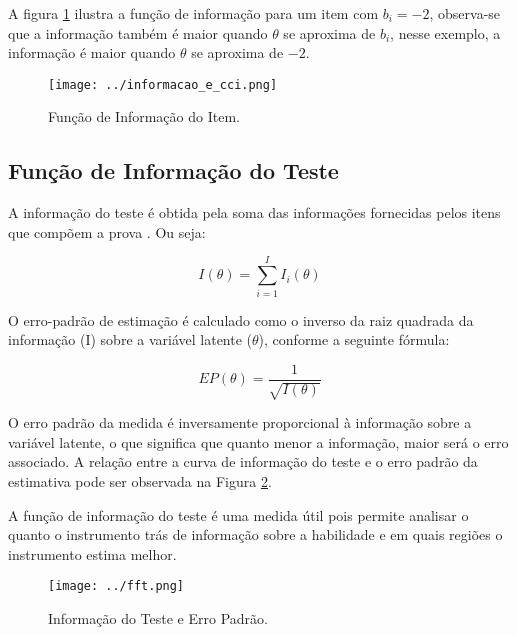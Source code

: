 A figura \ref{fig:fii} ilustra a função de informação para um item com $b_i = -2$, observa-se que a informação também é maior quando $\theta$ se aproxima de $b_i$, nesse exemplo, a informação é maior quando $\theta$ se aproxima de $-2$.

\begin{figure}[H]
	\centering
	\caption{Função de Informação do Item.}
	\texttt{[image: ../informacao\_e\_cci.png]}
		\parbox{\textwidth}{
		\centering %
	}
	\label{fig:fii}
\end{figure}

\subsection{Função de Informação do Teste}

A informação do teste é obtida pela soma das informações fornecidas pelos itens que compõem a prova \cite{de2000teoria}. Ou seja:

\begin{equation}\label{eq:info_teste}
I(\theta) = \sum_{i=1}^{I}I_i(\theta)
\end{equation}

 O erro-padrão de estimação é calculado como o inverso da raiz quadrada da informação (I) sobre a variável latente ($\theta$), conforme a seguinte fórmula:

\[
EP(\theta) = \dfrac{1}{\sqrt{I(\theta)}}
\]


O erro padrão da medida é inversamente proporcional à informação sobre a variável latente, o que significa que quanto menor a informação, maior será o erro associado. A relação entre a curva de informação do teste e o erro padrão da estimativa pode ser observada na Figura \ref{fig:fft}.

A função de informação do teste é uma medida útil pois permite analisar o quanto o instrumento trás de informação sobre a habilidade e em quais regiões o instrumento estima melhor.

\begin{figure}[H]
	\centering
	\caption{Informação do Teste e Erro Padrão.}
	\texttt{[image: ../fft.png]}
		\parbox{\textwidth}{
		\centering %
	}
	\label{fig:fft}
\end{figure}



